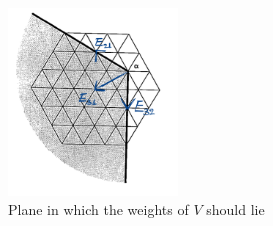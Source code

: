 \documentclass{report}
\begin{document}
\begin{figure}[h]
    \centering
    \includegraphics[width=0.4\textwidth]{plane_of_weights.png}
    \caption{Plane in which the weights of $V$ should lie}
    \label{fig:weights_plane}
\end{figure}
\end{document}
